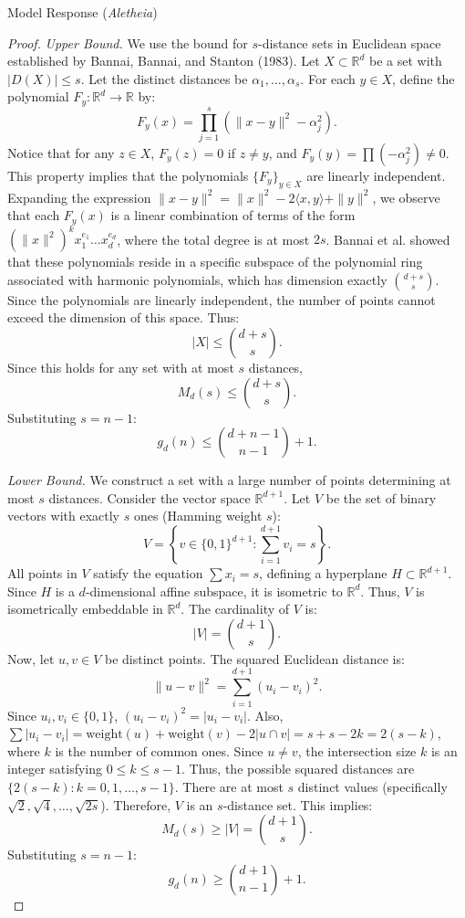 \documentclass[11pt]{article}
\begin{document}
\begin{solution}{Model Response (\emph{Aletheia})}
\begin{proof}
\textit{Upper Bound.}
We use the bound for $s$-distance sets in Euclidean space established by Bannai, Bannai, and Stanton (1983).
Let $X \subset \mathbb{R}^d$ be a set with $|D(X)| \le s$.
Let the distinct distances be $\alpha_1, \dots, \alpha_s$.
For each $y \in X$, define the polynomial $F_y: \mathbb{R}^d \to \mathbb{R}$ by:
\[ F_y(x) = \prod_{j=1}^s (\|x-y\|^2 - \alpha_j^2). \]
Notice that for any $z \in X$, $F_y(z) = 0$ if $z \ne y$, and $F_y(y) = \prod (-\alpha_j^2) \ne 0$.
This property implies that the polynomials $\{F_y\}_{y \in X}$ are linearly independent.
Expanding the expression $\|x-y\|^2 = \|x\|^2 - 2\langle x, y \rangle + \|y\|^2$, we observe that each $F_y(x)$ is a linear combination of terms of the form $(\|x\|^2)^k x_1^{e_1} \dots x_d^{e_d}$, where the total degree is at most $2s$.
Bannai et al. showed that these polynomials reside in a specific subspace of the polynomial ring associated with harmonic polynomials, which has dimension exactly $\binom{d+s}{s}$.
Since the polynomials are linearly independent, the number of points cannot exceed the dimension of this space.
Thus:
\[ |X| \le \binom{d+s}{s}. \]
Since this holds for any set with at most $s$ distances,
\[ M_d(s) \le \binom{d+s}{s}. \]
Substituting $s=n-1$:
\[ g_d(n) \le \binom{d+n-1}{n-1} + 1. \]

\textit{Lower Bound.}
We construct a set with a large number of points determining at most $s$ distances.
Consider the vector space $\mathbb{R}^{d+1}$. Let $V$ be the set of binary vectors with exactly $s$ ones (Hamming weight $s$):
\[ V = \left\{ v \in \{0,1\}^{d+1} : \sum_{i=1}^{d+1} v_i = s \right\}. \]
All points in $V$ satisfy the equation $\sum x_i = s$, defining a hyperplane $H \subset \mathbb{R}^{d+1}$. Since $H$ is a $d$-dimensional affine subspace, it is isometric to $\mathbb{R}^d$. Thus, $V$ is isometrically embeddable in $\mathbb{R}^d$.
The cardinality of $V$ is:
\[ |V| = \binom{d+1}{s}. \]
Now, let $u, v \in V$ be distinct points. The squared Euclidean distance is:
\[ \|u-v\|^2 = \sum_{i=1}^{d+1} (u_i - v_i)^2. \]
Since $u_i, v_i \in \{0,1\}$, $(u_i - v_i)^2 = |u_i - v_i|$.
Also, $\sum |u_i - v_i| = \text{weight}(u) + \text{weight}(v) - 2|u \cap v| = s + s - 2k = 2(s-k)$, where $k$ is the number of common ones.
Since $u \ne v$, the intersection size $k$ is an integer satisfying $0 \le k \le s-1$.
Thus, the possible squared distances are $\{ 2(s-k) : k = 0, 1, \dots, s-1 \}$.
There are at most $s$ distinct values (specifically $\sqrt{2}, \sqrt{4}, \dots, \sqrt{2s}$).
Therefore, $V$ is an $s$-distance set.
This implies:
\[ M_d(s) \ge |V| = \binom{d+1}{s}. \]
Substituting $s=n-1$:
\[ g_d(n) \ge \binom{d+1}{n-1} + 1. \]


\end{proof}
\end{solution}
\end{document}
